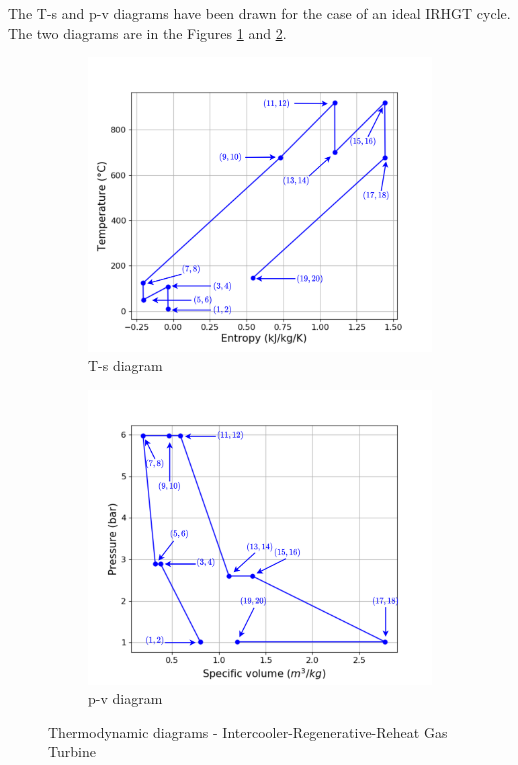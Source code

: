 The T-s and p-v diagrams have been drawn for the case of an ideal IRHGT cycle. The two diagrams are in the Figures \ref{fig:C5_Ts_IRHGT} and \ref{fig:C5_pv_IRHGT}.

\begin{figure}[h]
     \centering
     \begin{subfigure}[b]{0.4\textwidth}
         \centering
         \includegraphics[width=\textwidth]{Ts_IRHGT}
         \caption{T-s diagram}
         \label{fig:C5_Ts_IRHGT}
     \end{subfigure}
     \begin{subfigure}[b]{0.4\textwidth}
         \centering
         \includegraphics[width=\textwidth]{pv_IRHGT}
         \caption{p-v diagram}
         \label{fig:C5_pv_IRHGT}
     \end{subfigure}
        \caption{Thermodynamic diagrams - Intercooler-Regenerative-Reheat Gas Turbine}
        \label{fig:C5_thermo_diagram_IRHGT}
\end{figure}

